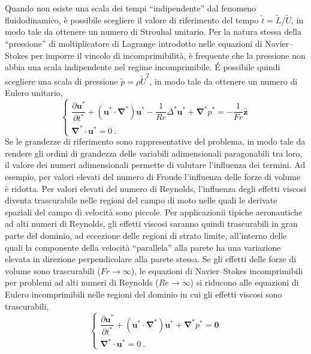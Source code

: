 Quando non esiste una scala dei tempi ``indipendente'' dal fenomeno fluidodinamico, è possibile scegliere il valore di riferimento del tempo $\tilde{t} = \tilde{L} / \tilde{U}$, in modo tale da ottenere un numero di Strouhal unitario. Per la natura stessa della ``pressione'' di moltiplicatore di Lagrange introdotto nelle equazioni di Navier--Stokes per imporre il vincolo di incomprimibilità, è frequente che la pressione non abbia una scala indipendente nel regime incomprimibile. \'E possibile quindi scegliere una scala di pressione $\tilde{p} = \rho \tilde{U}^2$, in modo tale da ottenere un numero di Eulero unitario,
\begin{equation}
\begin{cases}
 \dfrac{\partial \bm{u}^*}{\partial t^*} + (\bm{u}^* \cdot \bm{\nabla}^*) \bm{u}^* - \dfrac{1}{Re} \Delta^* \bm{u}^* + \bm{\nabla}^* p^* = -\dfrac{1}{Fr} \bm{\hat{z}} \\
 \bm{\nabla}^* \cdot \bm{u}^* = 0 \ .
\end{cases}
\end{equation}
Se le grandezze di riferimento sono rappresentative del problema, in modo tale da rendere gli ordini di grandezza delle variabili adimensionali paragonabili tra loro, il valore dei numeri adimensionali permette di valutare l'influenza dei termini. Ad esempio, per valori elevati del numero di Froude l'influenza delle forze di volume è ridotta. Per valori elevati del numero di Reynolds, l'influenza degli effetti viscosi diventa trascurabile nelle regioni del campo di moto nelle quali le derivate spaziali del campo di velocità sono piccole. Per applicazionii tipiche aeronautiche ad alti numeri di Reynolds, gli effetti viscosi saranno quindi trascurabili in gran parte del dominio, ad eccezione delle regioni di strato limite, all'interno delle quali la componente della velocità ``parallela'' alla parete ha una variazione elevata in direzione perpendicolare alla parete stessa.
Se gli effetti delle forze di volume sono trascurabili ($Fr \rightarrow \infty$), le equazioni di Navier--Stokes incomprimibili per problemi ad alti numeri di Reynolds ($Re \rightarrow \infty$) si riducono alle equazioni di Eulero incomprimibili nelle regioni del dominio in cui gli effetti viscosi sono trascurabili,
\begin{equation}
\begin{cases}
 \dfrac{\partial \bm{u}^*}{\partial t^*} + (\bm{u}^* \cdot \bm{\nabla}^*) \bm{u}^* + \bm{\nabla}^* p^* = \bm{0} \\
 \bm{\nabla}^* \cdot \bm{u}^* = 0 \ .
\end{cases}
\end{equation}

